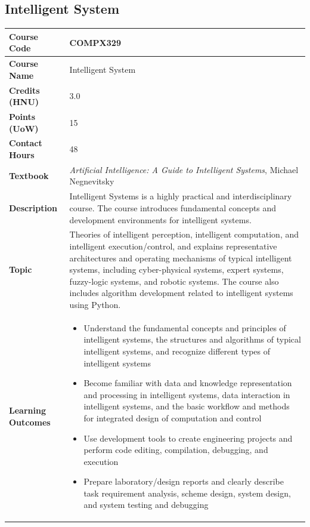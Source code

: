\documentclass{article}
\begin{document}
\subsection[COMPX329 Intelligent System]{Intelligent System}
\renewcommand{\arraystretch}{1.5} %
\begin{longtable}{|p{3cm}|p{10cm}|}
\hline
\textbf{Course Code} & COMPX329 \\
\hline
\textbf{Course Name} & Intelligent System \\
\hline
\textbf{Credits (HNU)} & 3.0 \\
\hline
\textbf{Points (UoW)} & 15 \\
\hline
\textbf{Contact Hours} & 48 \\
\hline
\textbf{Textbook} & \emph{Artificial Intelligence: A Guide to Intelligent Systems}, Michael Negnevitsky\\
\hline
\textbf{Description} & Intelligent Systems is a highly practical and interdisciplinary course. The course introduces fundamental concepts and development environments for intelligent systems.\\
\hline
\textbf{Topic} & Theories of intelligent perception, intelligent computation, and intelligent execution/control, and explains representative architectures and operating mechanisms of typical intelligent systems, including cyber-physical systems, expert systems, fuzzy-logic systems, and robotic systems. The course also includes algorithm development related to intelligent systems using Python. \\
\hline
\textbf{Learning Outcomes} & 
    \begin{itemize}
        \item Understand the fundamental concepts and principles of intelligent systems, the structures and algorithms of typical intelligent systems, and recognize different types of intelligent systems
        \item Become familiar with data and knowledge representation and processing in intelligent systems, data interaction in intelligent systems, and the basic workflow and methods for integrated design of computation and control
        \item Use development tools to create engineering projects and perform code editing, compilation, debugging, and execution
        \item Prepare laboratory/design reports and clearly describe task requirement analysis, scheme design, system design, and system testing and debugging
    \end{itemize} \\
\hline
\end{longtable}
\end{document}
